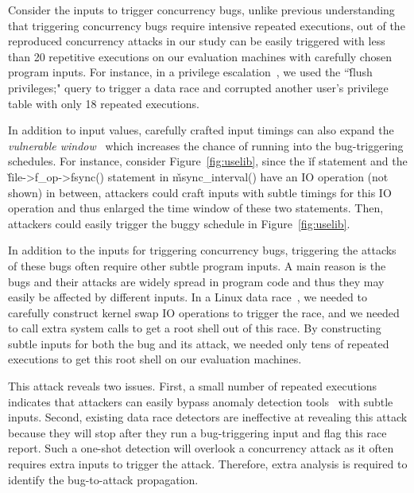  Consider the inputs to trigger 
concurrency bugs, unlike previous 
understanding~\cite{pres:sosp09,cui:tern:osdi10} that 
triggering concurrency bugs require intensive repeated executions, 
\nreproducedNoRetry out of the
\nreproduced reproduced concurrency attacks in our study can be easily 
triggered with less than 20 repetitive executions on our evaluation machines 
with carefully chosen program inputs. For instance, in a \mysql 
privilege escalation~\cite{mysql-bug-24988}, we used the ``\v{flush 
privileges;}" query to trigger a data race and corrupted another \mysql user's 
privilege table with only 18 repeated executions.

In addition to input values, carefully crafted input timings can also expand 
the \emph{vulnerable window}~\cite{con:hotpar12} which increases the chance of 
running into the bug-triggering schedules. For 
instance, consider Figure~\ref{fig:uselib}, since the \v{if} statement and the  
\v{file->f\_op->fsync()} statement in \v{msync\_interval()} have an IO 
operation (not shown) in between, attackers could craft inputs with subtle timings 
for this IO operation and thus enlarged the time window of these two statements. 
Then, attackers could easily trigger the buggy schedule in Figure~\ref{fig:uselib}.

In addition to the inputs for triggering concurrency bugs, triggering the 
attacks of these bugs often require other subtle program inputs. A main 
reason is the bugs and their attacks are widely spread in program 
code and thus they may easily be affected by different inputs. In a Linux 
\uselib data race~\cite{uselib-bug-12791}, 
we needed to carefully construct kernel swap IO operations to trigger the race, 
and we needed to call extra system calls to get a root shell out of this race. 
By constructing subtle inputs for both the bug and its attack, we needed only 
tens of repeated executions to get this root shell on our evaluation machines.

This \uselib attack reveals two issues. First, a small number of repeated 
executions indicates that attackers can easily bypass anomaly detection 
tools~\cite{schonberg:pldi89,taskrecycling:ppopp90,diduce:icse02} 
with subtle inputs. Second, existing data race detectors are ineffective at 
revealing this attack because they will stop after they run a bug-triggering input 
and flag this race report. Such a one-shot detection will overlook a 
concurrency attack as it often requires extra inputs to trigger the attack. 
Therefore, extra analysis is required to identify the bug-to-attack propagation.

